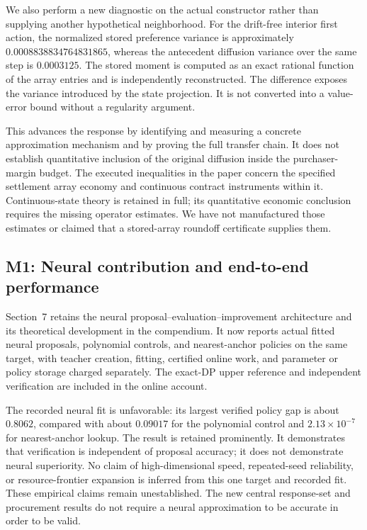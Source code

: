 We also perform a new diagnostic on the actual constructor rather than supplying another hypothetical neighborhood. For the drift-free interior first action, the normalized stored preference variance is approximately $0.0008838834764831865$, whereas the antecedent diffusion variance over the same step is $0.0003125$. The stored moment is computed as an exact rational function of the array entries and is independently reconstructed. The difference exposes the variance introduced by the state projection. It is not converted into a value-error bound without a regularity argument.

This advances the response by identifying and measuring a concrete approximation mechanism and by proving the full transfer chain. It does not establish quantitative inclusion of the original diffusion inside the purchaser-margin budget. The executed inequalities in the paper concern the specified settlement array economy and continuous contract instruments within it. Continuous-state theory is retained in full; its quantitative economic conclusion requires the missing operator estimates. We have not manufactured those estimates or claimed that a stored-array roundoff certificate supplies them.

\subsection{M1: Neural contribution and end-to-end performance}
Section~7 retains the neural proposal--evaluation--improvement architecture and its theoretical development in the compendium. It now reports actual fitted neural proposals, polynomial controls, and nearest-anchor policies on the same target, with teacher creation, fitting, certified online work, and parameter or policy storage charged separately. The exact-DP upper reference and independent verification are included in the online account.

The recorded neural fit is unfavorable: its largest verified policy gap is about $0.8062$, compared with about $0.09017$ for the polynomial control and $2.13\times10^{-7}$ for nearest-anchor lookup. The result is retained prominently. It demonstrates that verification is independent of proposal accuracy; it does not demonstrate neural superiority. No claim of high-dimensional speed, repeated-seed reliability, or resource-frontier expansion is inferred from this one target and recorded fit. These empirical claims remain unestablished. The new central response-set and procurement results do not require a neural approximation to be accurate in order to be valid.


